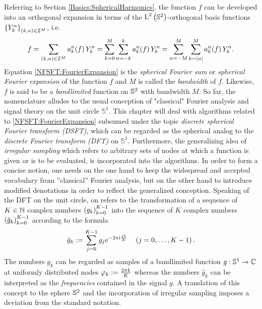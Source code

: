 Referring to Section \ref{Basics:SphericalHarmonics}, the function $f$ can be developed into an orthogonal expansion in terms of the $\text{\rm{L}}^{2}\left(\mathbb{S}^2\right)$-orthogonal basis functions $\left\{Y_{k}^n\right\rbrace_{(k,n) \in \mathcal{I}^M}$, i.e.
\begin{equation}
  \label{NFSFT:FourierExpansion} 
  f = \sum_{\left(k,n\right) \in\mathcal{I}^M} a_k^n{\hspace{-0.4ex}}\left(f\right) Y_{k}^n = \sum_{k=0}^M \sum_{n=-k}^k a_k^n{\hspace{-0.4ex}}\left(f\right) Y_{k}^n = \sum_{n=-M}^M \sum_{k=\left\vert n\right\vert}^M a_k^n{\hspace{-0.4ex}}\left(f\right) Y_{k}^n.
\end{equation}  
Equation \eqref{NFSFT:FourierExpansion} is the \emph{spherical Fourier sum} or \emph{spherical Fourier expansion} of the function $f$ and $M$ is called the \emph{bandwidth} of $f$. Likewise, $f$ is said to be a \emph{bandlimited} function on $\mathbb{S}^2$ with bandwidth $M$. So far, the nomenclature alludes to the usual conception of "classical" Fourier analysis and signal theory on the unit circle $\mathbb{S}^1$.
This chapter will deal with algorithms related to \eqref{NFSFT:FourierExpansion} subsumed under the topic \emph{discrete spherical Fourier transform (DSFT)}, which can be regarded as the spherical analog to the \emph{discrete Fourier transform (DFT)} on $\mathbb{S}^1$. Furthermore, the generalizing idea of \emph{irregular sampling} which refers to arbitrary sets of nodes at which a function is given or is to be evaluated, is incorporated into the algorithms. In order to form a concise notion, one needs on the one hand to keep the widespread and accepted vocabulary from ''classical'' Fourier analysis, but on the other hand to introduce modified denotations in order to reflect the generalized conception.
Speaking of the DFT on the unit circle, on refers to the transformation of a sequence of $K \in \mathbb{N}$ complex numbers $\left(g_{k}\right)_{k=0}^{K-1}$ into the sequence of $K$ complex numbers $\left(\hat{g}_{k}\right)_{k=0}^{K-1}$ according to the formula
\[
  \hat{g}_{k} := \sum_{j=0}^{K-1} g_{j} \mbox{\rm{e}}^{-2\pi\mbox{\scriptsize\rm{i}} \frac{jk}{K}} \quad \left(j=0,\ldots,K-1\right).
\]
The numbers $g_{k}$ can be regarded as samples of a bandlimited function $g: \mathbb{S}^1 \rightarrow \mathbb{C}$ at uniformly distributed nodes $\varphi_{k} := \frac{2\pi k}{K}$ whereas the numbers $\hat{g}_{k}$
can be interpreted as the \emph{frequencies} contained in the signal $g$.
A translation of this concept to the sphere $\mathbb{S}^2$ and the incorporation of irregular sampling imposes a deviation from the standard notation. 

